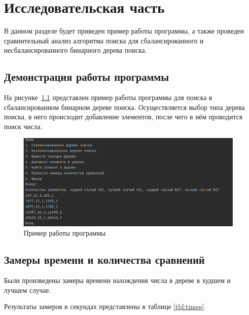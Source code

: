 \chapter{Исследовательская часть}

В данном разделе будет приведен пример работы программы, а также проведен сравнительный анализ алгоритма поиска для сбалансированного и несбалансированного бинарного дерева поиска.

\section{Демонстрация работы программы}

На рисунке~\ref{img:example}  представлен пример работы программы для поиска в сбалансированном бинарном дереве поиска.
Осуществляется выбор типа дерева поиска, в него происходит добавление элементов, после чего в нём проводится поиск числа.

\begin{figure}[h]
	\centering
	\includegraphics[width=1.0\textwidth]{img/example.png}
	\caption{Пример работы программы}
	\label{img:example}
\end{figure}

\section{Замеры времени и количества сравнений}

Были произведены замеры времени нахождения числа в дереве в худшем и лучшем случае.

Результаты замеров в секундах представлены в таблице \ref*{tbl:times}.

